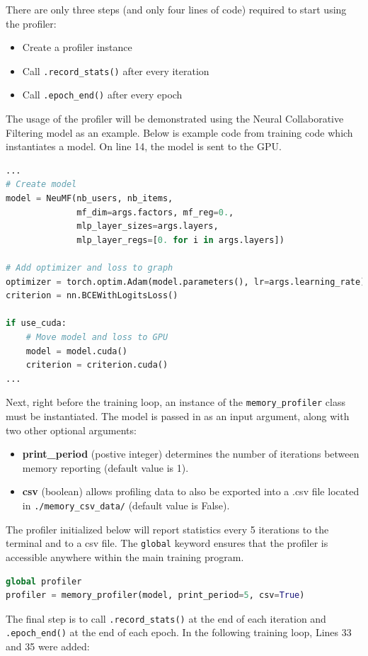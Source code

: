 \documentclass[12pt,letterpaper]{article}
\newenvironment{myitemize}
{ \begin{itemize}
    \setlength{\itemsep}{0pt}
    \setlength{\parskip}{0pt}
    \setlength{\parsep}{0pt}     }
{ \end{itemize}                  }
\begin{document}
There are only three steps (and only four lines of code) required to start using the profiler:
\begin{myitemize}
\item Create a profiler instance
\item Call \texttt{.record\_stats()} after every iteration
\item Call \texttt{.epoch\_end()} after every epoch
\end{myitemize}
The usage of the profiler will be demonstrated using the Neural Collaborative Filtering model as an example. Below is example code from training code \cite{tbd_suite} which instantiates a model. On line 14, the model is sent to the GPU.
\begin{lstlisting}[language=Python]
...
# Create model
model = NeuMF(nb_users, nb_items,
              mf_dim=args.factors, mf_reg=0.,
              mlp_layer_sizes=args.layers,
              mlp_layer_regs=[0. for i in args.layers])

# Add optimizer and loss to graph
optimizer = torch.optim.Adam(model.parameters(), lr=args.learning_rate)
criterion = nn.BCEWithLogitsLoss()

if use_cuda:
    # Move model and loss to GPU
    model = model.cuda()
    criterion = criterion.cuda()
...
\end{lstlisting}
Next, right before the training loop, an instance of the \texttt{memory\_profiler} class must be instantiated. The model is passed in as an input argument, along with two other optional arguments:
\begin{myitemize}
\item \textbf{print\_period} (postive integer) determines the number of iterations between memory reporting (default value is 1).
\item \textbf{csv} (boolean) allows profiling data to also be exported into a .csv file located in \texttt{./memory\_csv\_data/} (default value is False).
\end{myitemize}
The profiler initialized below will report statistics every 5 iterations to the terminal and to a csv file. The \texttt{global} keyword ensures that the profiler is accessible anywhere within the main training program.
\begin{lstlisting}[language=Python]
global profiler
profiler = memory_profiler(model, print_period=5, csv=True)
\end{lstlisting}
The final step is to call \texttt{.record\_stats()} at the end of each iteration and \texttt{.epoch\_end()} at the end of each epoch. In the following training loop, Lines 33 and 35 were added:
\end{document}

